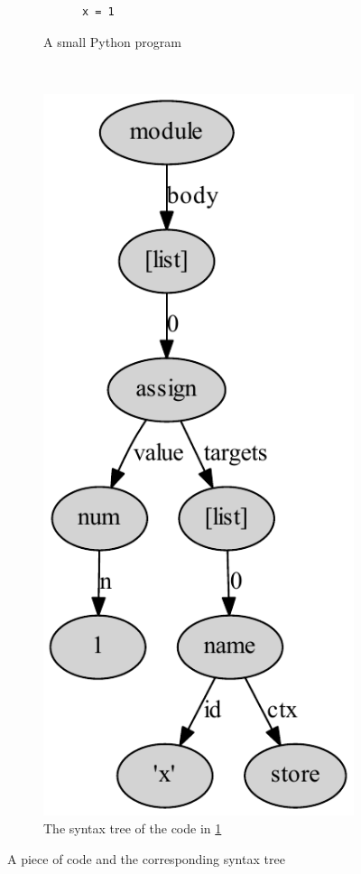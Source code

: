 \begin{figure}
  
  \begin{subfigure}[b]{0.5\textwidth}
    \begin{lstlisting}
      x = 1
    \end{lstlisting}
    \caption{A small Python program}
    \label{ast_code}
  \end{subfigure}
  ~
  \begin{subfigure}[b]{0.5\textwidth}
    \includegraphics[scale=0.7]{figures/simple_ast.pdf}
    \caption{The syntax tree of the code in \cref{ast_code}}
  \end{subfigure}
  
  \caption{A piece of code and the corresponding syntax tree}
  \label{ast_example}
\end{figure}
